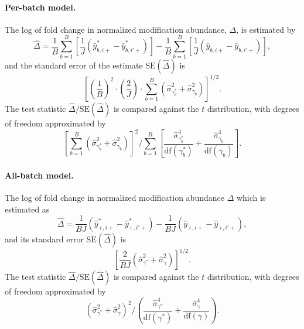 \documentclass{mcp}
\begin{document}
\paragraph{Per-batch model.}
The log of fold change in normalized modification abundance, $\Delta$, is estimated by 
\[
\hat{\Delta} = \frac{1}{B} \sum_{b=1}^{B} \left[ \frac{1}{J} \left( \hat{y}_{b,i+}^{\ast} - \hat{y}_{b,i'+}^{\ast} \right) \right] - \frac{1}{B} \sum_{b=1}^{B} \left[ \frac{1}{J} \left( \hat{y}_{b,i+} - \hat{y}_{b,i'+} \right) \right],
\]
and the standard error of the estimate $\mathrm{SE}(\hat{\Delta})$ is 
\[
\left[ \left(\frac{1}{B}\right)^2 \cdot \left( \frac{2}{J} \right) \cdot \sum_{b=1}^{B} \left( \hat{\sigma}_{\gamma_b^{\ast}}^{2} + \hat{\sigma}_{\gamma_b}^{2} \right) \right]^{1/2}.
\]
The test statistic $\hat{\Delta} / \mathrm{SE}(\hat{\Delta})$ is compared against the $t$ distribution, with degrees of freedom approximated by
\[
\left[ \sum_{b=1}^{B} \left( \hat{\sigma}_{\gamma_{b}^{\ast}}^{2} + \hat{\sigma}_{\gamma_{b}}^{2} \right) \right]^2 \bigg/
\sum_{b=1}^{B} \left[ \frac{\hat{\sigma}_{\gamma_{b}^{\ast}}^{4}}{\mathrm{df}(\gamma_b^{\ast})} + \frac{\hat{\sigma}_{\gamma_{b}}^{4}}{  \mathrm{df}(\gamma_b)} \right].
\]


\paragraph{All-batch model.} 
The log of fold change in normalized modification abundance $\Delta$ which is estimated as 
\[
\hat{\Delta} = \frac{1}{BJ} \left( \hat{y}_{+,i+}^{\ast} - \hat{y}_{+,i'+}^{\ast} \right) - \frac{1}{BJ} \left( \hat{y}_{+,i+} - \hat{y}_{+,i'+} \right),
\]
and its standard error $\mathrm{SE}(\hat{\Delta})$ is 
\[
\left[ \frac{2}{BJ} \left( \hat{\sigma}_{\gamma^{\ast}}^{2} + \hat{\sigma}_{\gamma}^{2} \right) \right] ^{1/2}.
\]
The test statistic $\hat{\Delta} / \mathrm{SE}(\hat{\Delta})$ is compared against the $t$ distribution, with degrees of freedom approximated by
\[
\left( \hat{\sigma}_{\gamma^{\ast}}^{2} + \hat{\sigma}_{\gamma}^{2} \right)^2 \bigg/
\left( \frac{\hat{\sigma}_{\gamma^{\ast}}^{4}}{\mathrm{df}(\gamma^{\ast})} + \frac{\hat{\sigma}_{\gamma}^{4}}{  \mathrm{df}(\gamma)} \right).
\]
\end{document}
